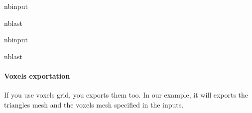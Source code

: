 \documentclass[letterpaper,10pt,english]{sphinxmanual}
\begin{document}
\begin{sphinxuseclass}{nbinput}
\begin{sphinxuseclass}{nblast}
{
\begin{sphinxVerbatim}[commandchars=\\\{\}]
\llap{\color{nbsphinxin}[13]:\,\hspace{\fboxrule}\hspace{\fboxsep}}  
  
  
  
\end{sphinxVerbatim}
}

\end{sphinxuseclass}
\end{sphinxuseclass}
\begin{sphinxuseclass}{nbinput}
\begin{sphinxuseclass}{nblast}
{
\begin{sphinxVerbatim}[commandchars=\\\{\}]
\llap{\color{nbsphinxin}[14]:\,\hspace{\fboxrule}\hspace{\fboxsep}}
\end{sphinxVerbatim}
}

\end{sphinxuseclass}
\end{sphinxuseclass}

\paragraph{Voxels exportation}
\label{\detokenize{misc_functionnalities:Voxels-exportation}}
\sphinxAtStartPar
If you use voxels grid, you exports them too. In our example, it will exports the triangles mesh and the voxels mesh specified in the inputs.
\end{document}
